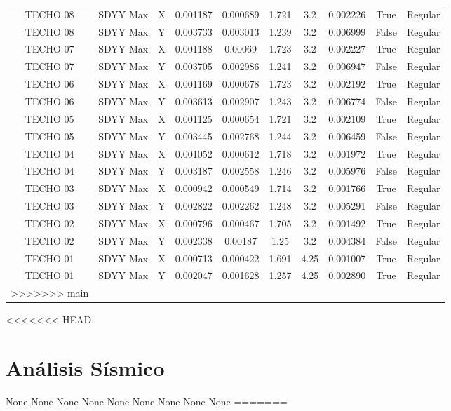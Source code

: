 \documentclass{article}%
\begin{document}
\begin{table}[ht!]
{\begin{tabular}{cccccccccc}
TECHO 08 & SDYY Max & X & 0.001187 & 0.000689 & 1.721 & 3.2 & 0.002226 & True & Regular \\
TECHO 08 & SDYY Max & Y & 0.003733 & 0.003013 & 1.239 & 3.2 & 0.006999 & False & Regular \\
TECHO 07 & SDYY Max & X & 0.001188 & 0.00069 & 1.723 & 3.2 & 0.002227 & True & Regular \\
TECHO 07 & SDYY Max & Y & 0.003705 & 0.002986 & 1.241 & 3.2 & 0.006947 & False & Regular \\
TECHO 06 & SDYY Max & X & 0.001169 & 0.000678 & 1.723 & 3.2 & 0.002192 & True & Regular \\
TECHO 06 & SDYY Max & Y & 0.003613 & 0.002907 & 1.243 & 3.2 & 0.006774 & False & Regular \\
TECHO 05 & SDYY Max & X & 0.001125 & 0.000654 & 1.721 & 3.2 & 0.002109 & True & Regular \\
TECHO 05 & SDYY Max & Y & 0.003445 & 0.002768 & 1.244 & 3.2 & 0.006459 & False & Regular \\
TECHO 04 & SDYY Max & X & 0.001052 & 0.000612 & 1.718 & 3.2 & 0.001972 & True & Regular \\
TECHO 04 & SDYY Max & Y & 0.003187 & 0.002558 & 1.246 & 3.2 & 0.005976 & False & Regular \\
TECHO 03 & SDYY Max & X & 0.000942 & 0.000549 & 1.714 & 3.2 & 0.001766 & True & Regular \\
TECHO 03 & SDYY Max & Y & 0.002822 & 0.002262 & 1.248 & 3.2 & 0.005291 & False & Regular \\
TECHO 02 & SDYY Max & X & 0.000796 & 0.000467 & 1.705 & 3.2 & 0.001492 & True & Regular \\
TECHO 02 & SDYY Max & Y & 0.002338 & 0.00187 & 1.25 & 3.2 & 0.004384 & False & Regular \\
TECHO 01 & SDYY Max & X & 0.000713 & 0.000422 & 1.691 & 4.25 & 0.001007 & True & Regular \\
TECHO 01 & SDYY Max & Y & 0.002047 & 0.001628 & 1.257 & 4.25 & 0.002890 & True & Regular \\
>>>>>>> main
\bottomrule
\end{tabular}
}%
\end{table}

%
<<<<<<< HEAD
\section{Análisis Sísmico}%
\label{sec:AnlisisSsmico}%
None%
None%
None%
None%
None%
None%
None%
None%
None
=======
\end{document}
